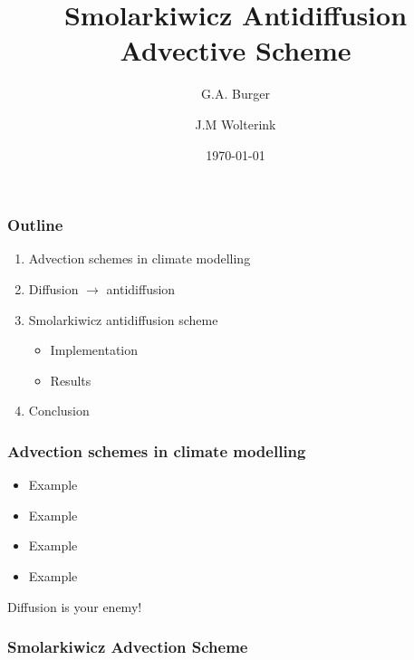 \documentclass{beamer}
\author{G.A. Burger \and J.M Wolterink}
\date{\today}
\title{Smolarkiwicz Antidiffusion Advective Scheme}
\begin{document}
\begin{frame}
\maketitle
\end{frame}

\begin{frame}
 \frametitle{Outline}
 \begin{enumerate}
  \item Advection schemes in climate modelling
  \item Diffusion $\rightarrow$ antidiffusion
  \item Smolarkiwicz antidiffusion scheme
  \begin{itemize}
   \item Implementation
   \item Results
  \end{itemize}
  \item Conclusion
 \end{enumerate}

\end{frame}

\begin{frame}
 \frametitle{Advection schemes in climate modelling}
 \begin{itemize}
  \item Example
  \item Example
  \item Example
  \item Example
 \end{itemize}
\end{frame}

\begin{frame}
 \begin{center}
  \huge{Diffusion is your enemy!}
 \end{center}
\end{frame}

\begin{frame}
 \frametitle{Smolarkiwicz Advection Scheme}
\end{frame}
\end{document}
